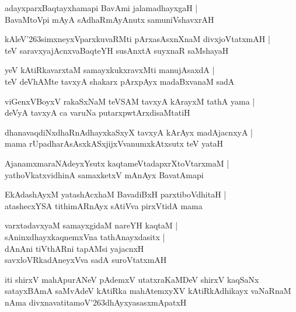 \documentclass[twoside,12pt,openright]{book}
\def\S{\char'263}
\newcounter{shloka}[chapter]
\begin{document}
\begin{shloka}%
adayxparxBaqtayxhamapi BavAmi jalamadhayxgaH |\\
BavaMtoVpi mAyA sAdhaRmAyAnutx samuniVshavxrAH 
\end{shloka}

\begin{shloka}%
kAleV\S simxneyxVparxkuvaRMti pArxasAsxnXnaM divxjoVtatxmAH |\\
teV saravxyajAcnxvaBaqteYH susAnxtA suyxnaR saMshayaH 
\end{shloka}

\begin{shloka}%
yeV kAtiRkavarxtaM samayxkukxravxMti manujAsaxdA |\\
teV deVhAMte tavxyA shakarx pArxpAyx madaBxvanaM sadA
\end{shloka}

\begin{shloka}%
viGenxVBoyxV rakaSxNaM teVSAM tavxyA kArayxM tathA yama |\\
deVyA tavxyA ca varuNa putarxpwtArxdisaMtatiH 
\end{shloka}

\begin{shloka}%
dhanavaqdiNxdhaRnAdhayxkaSxyX tavxyA kArAyx madAjacnxyA |\\
mama rUpadharAsAsxkASxjijxVvanumxkAtxsutx teV yataH 
\end{shloka}

\begin{shloka}%
AjanamxmaraNAdeyxYsutx kaqtameVtadapxrXtoVtarxmaM |\\
yathoVkatxvidhinA samaxketxV mAnAyx BavatAmapi 
\end{shloka}

\begin{shloka}%
EkAdashAyxM yatashAcxhaM BavadiBxH parxtiboVdhitaH |\\
atashecxYSA tithimARnAyx sAtiVva pirxVtidA mama
\end{shloka}

\begin{shloka}%
varxtadavxyaM samayxgidaM nareYH kaqtaM |\\
sAninxdhayxkaqnemxVna tathAnayxdasitx |\\
dAnAni tiVthARni tapAMsi yajacnxH  \\
savxloVRkadAneyxVva sadA suroVtatxmAH 
\end{shloka}

\begin{center}
iti shirxV mahApurANeV pAdemxV utatxraKaMDeV shirxV kaqSaNx satayxBAmA saMvAdeV kAtiRka mahAtemxyXV 
kAtiRkAdhikayx vaNaRnaM nAma divxnavatitamoV\S dhAyxyasasxmApatxH 
\end{center}
\end{document}
